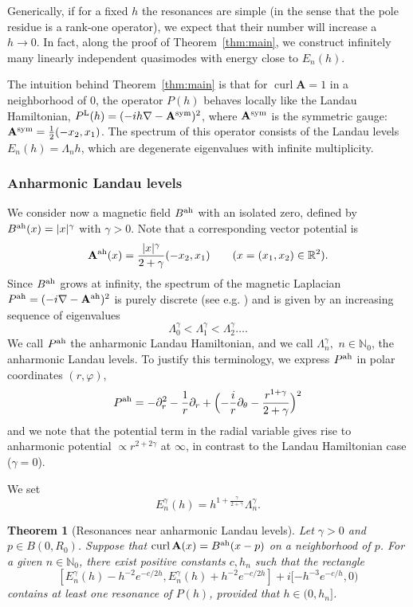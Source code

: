 \documentclass[11pt]{amsart}
\newtheorem{theorem}{Theorem}[section]
\theoremstyle{remark}
\newcommand{\bA}{\mathbf{A}}
\newcommand{\R}{\mathbb{R}}
\DeclareMathOperator{\Curl}{curl}
\numberwithin{equation}{section}
\begin{document}
Generically, if for a fixed $h$ the resonances are simple (in the sense that the pole residue is a rank-one operator), we expect that their number will increase a $h\to 0$. In fact, along the proof of Theorem~\ref{thm:main}, we construct infinitely many linearly independent quasimodes with energy close to $E_n(h)$.
%
%
% 
\medskip

The intuition behind Theorem~\ref{thm:main} is that for $\Curl\bA=1$ in a neighborhood of $0$, the operator $P(h)$ behaves locally like the Landau Hamiltonian, $P^{\rm L}(h)=(-ih\nabla -\bA^{\rm sym})^2$, where $\bA^{\rm sym}$ is the symmetric gauge: $\bA^{\rm sym}=\frac12(-x_2,x_1)$. The spectrum of this operator consists of the Landau levels $E_n(h)=\Lambda_n h$, which are degenerate eigenvalues with infinite multiplicity.


\subsubsection*{Anharmonic Landau levels}
%
We consider now a  magnetic field $B^{\rm ah}$ with an isolated zero, defined by $B^{\rm ah}(x)=|x|^\gamma$ with $\gamma> 0$.  
%
%
%
Note that  a corresponding vector potential is
\[\bA^{\rm ah}(x)=\frac{|x|^\gamma}{2+\gamma}(-x_2,x_1)\qquad (x=(x_1,x_2)\in\R^2).\]
Since $B^{\rm ah}$ grows at infinity, the spectrum of the magnetic Laplacian 
$P^{\rm ah}=(-i\nabla-\bA^{\rm ah})^2$ is purely discrete (see e.g. \cite[Corollary~1.2]{HM}) and is given by an increasing sequence of eigenvalues 
\[\Lambda_0^\gamma<\Lambda_1^\gamma<\Lambda_2^\gamma\dots.\]
We call $P^{\rm ah}$ the anharmonic Landau Hamiltonian, and we call $\Lambda_n^\gamma,$ $n\in\mathbb N_0$, the anharmonic Landau levels.
%
To justify this terminology, we express $P^{\rm ah}$ in polar coordinates $(r,\varphi)$,
\[P^{\rm ah}=-\partial_r^2-\frac{1}{r}\partial_r+\Bigl(-\frac{i}{r}\partial_\theta-\frac{r^{1+\gamma}}{2+\gamma}\Bigr)^2\]
and we note that the potential term in the radial variable gives rise to anharmonic potential $\propto r^{2+2\gamma}$ at $\infty$, in contrast to the Landau Hamiltonian case ($\gamma=0$). \medskip

We set
\[E_n^\gamma(h)=h^{1+\frac{\gamma}{2+\gamma}}\Lambda_n^\gamma.\]

\begin{theorem}[Resonances near anharmonic Landau levels] \label{thm:main-ah}
%
Let $\gamma>0$ and $p\in B(0,R_0)$. Suppose that $\Curl\bA(x)=B^{\rm ah}(x-p)$ on a neighborhood of $p$. For a given $n\in\mathbb N_0$, there exist positive constants $c,h_n$ such that
    the rectangle
\[
 [E_n^\gamma(h) - h^{-2}e^{-c/2h}, E_n^\gamma(h) +h^{-2}e^{-c/2h}] + i[-h^{-3}e^{-c/h}, 0)
\]
contains at least one resonance of $P(h)$, provided that $h\in(0,h_n]$.
\end{theorem}
\end{document}

